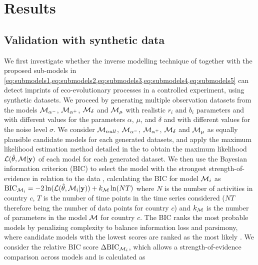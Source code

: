
\section{Results}
\label{sec:results}
\subsection{Validation with synthetic data}\label{sec:synthetic}
We first investigate whether the inverse modelling technique of \citep{Boussange2022a} together with the proposed sub-models in \cref{eq:submodels1,eq:submodels2,eq:submodels3,eq:submodels4,eq:submodels5} can detect imprints of eco-evolutionary processes in a controlled experiment, using synthetic datasets.
%
We proceed by generating multiple observation datasets from the models $\mathcal{M}_{\alpha^-}$, $\mathcal{M}_{\alpha^+}$, $\mathcal{M}_\delta$ and $\mathcal{M}_\mu$ with realistic $r_i$ and $b_i$ parameters and with different values for the parameters $\alpha$, $\mu$, and $\delta$ and with different values for the noise level $\sigma$. We consider $\mathcal{M}_{null}$, $\mathcal{M}_{\alpha^-}$, $\mathcal{M}_{\alpha^+}$, $\mathcal{M}_\delta$ and $\mathcal{M}_\mu$ as equally plausible candidate models for each generated datasets, and apply the maximum likelihood estimation method detailed in the  to obtain the maximum likelihood $\mathcal{L}(\hat \theta, \mathcal{M} | \textbf{y})$ of each model for each generated dataset. We then use the Bayesian information criterion (BIC) to select the model with the strongest strength-of-evidence in relation to the data \citep{Mangan2017}, calculating the BIC for model $\mathcal{M}_i$ as $\text{BIC}_{\mathcal{M}_i} = -2 \ln(\mathcal{L}(\hat \theta, \mathcal{M}_i | \textbf{y})) + k_{\mathcal{M}} \ln(N T ) $
% 
where $N$ is the number of activities in country $c$, $T$ is the number of time points in the time series considered ($N T$ therefore being the number of data points for country $c$) and $k_{\mathcal{M}}$ is the number of parameters in the model $\mathcal{M}$ for country $c$.
% 
The BIC ranks the most probable models by penalizing complexity to balance information loss and parsimony, where candidate models with the lowest scores are ranked as the most likely \citep{Mangan2017}.
% 
We consider the relative BIC score $\Delta \text{BIC}_{\mathcal{M}_i}$, which allows a strength-of-evidence comparison across models and is calculated as 
